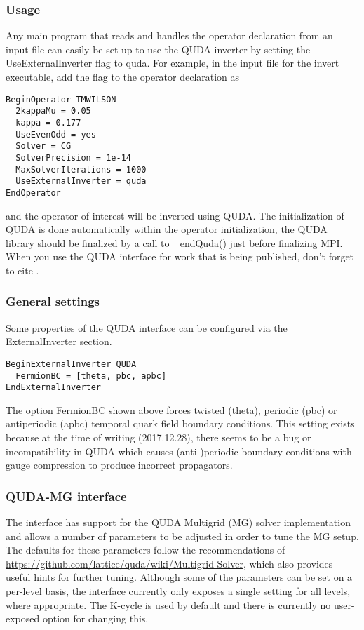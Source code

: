 \subsubsection{Usage}
Any main program that reads and handles the operator declaration from an input file can easily be set up to use the QUDA inverter by setting the {\ttfamily UseExternalInverter} flag to {\ttfamily quda}. For example, in the input file for the {\ttfamily invert} executable, add the flag to the operator declaration as
\begin{verbatim}
BeginOperator TMWILSON
  2kappaMu = 0.05
  kappa = 0.177
  UseEvenOdd = yes
  Solver = CG
  SolverPrecision = 1e-14
  MaxSolverIterations = 1000
  UseExternalInverter = quda
EndOperator
\end{verbatim}
and the operator of interest will be inverted using QUDA. The initialization of QUDA is done automatically within the operator initialization,  the QUDA library should be finalized by a call to {\ttfamily \_endQuda()} just before finalizing MPI. When you use the QUDA interface for work that is being published, don't forget to cite \cite{Clark:2009wm, Babich:2011np, Strelchenko:2013vaa}.

\subsubsection{General settings}
Some properties of the QUDA interface can be configured via the {\ttfamily ExternalInverter} section.
\begin{verbatim}
BeginExternalInverter QUDA
  FermionBC = [theta, pbc, apbc]
EndExternalInverter
\end{verbatim}

The option {\ttfamily FermionBC} shown above forces twisted ({\ttfamily theta}), periodic ({\ttfamily pbc}) or antiperiodic ({\ttfamily apbc}) temporal quark field boundary conditions.
This setting exists because at the time of writing (2017.12.28), there seems to be a bug or incompatibility in QUDA which causes (anti-)periodic boundary conditions with gauge compression to produce incorrect propagators.

\subsubsection{QUDA-MG interface}
The interface has support for the QUDA Multigrid (MG) solver implementation and allows a number of parameters to be adjusted in order to tune the MG setup.
The defaults for these parameters follow the recommendations of \url{https://github.com/lattice/quda/wiki/Multigrid-Solver}, which also provides useful hints for further tuning.
Although some of the parameters can be set on a per-level basis, the interface currently only exposes a single setting for all levels, where appropriate.
The K-cycle is used by default and there is currently no user-exposed option for changing this.

